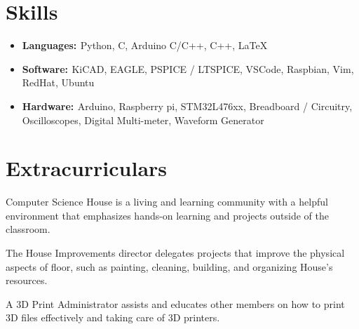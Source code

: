 \documentclass[a4paper]{comcv}
\begin{document}

\smallskip

\section{Skills}
\begin{itemize}
    \item {\bf{Languages: }}  {Python, C, Arduino C/C++, C++, \LaTeX} 
    
    \item {\bf{Software: }} {KiCAD, EAGLE, PSPICE / LTSPICE, VSCode, Raspbian, Vim, RedHat, Ubuntu}
    
    \item {\bf{Hardware: }}  {Arduino, Raspberry pi, STM32L476xx, Breadboard / Circuitry, Oscilloscopes, Digital Multi-meter, Waveform Generator} 
\end{itemize}
\smallskip

\section{Extracurriculars}

\vspace{\topsep}
\smallskip
\begin{tightlist}
    \item Computer Science House is a living and learning community with a helpful environment that emphasizes hands-on learning and projects outside of the classroom.

    \item The House Improvements director delegates projects that improve the physical aspects of floor, such as painting, cleaning, building, and organizing House's resources.

	\item A 3D Print Administrator assists and educates other members on how to print 3D files effectively and taking care of 3D printers.
	
\end{tightlist}
\end{document}
